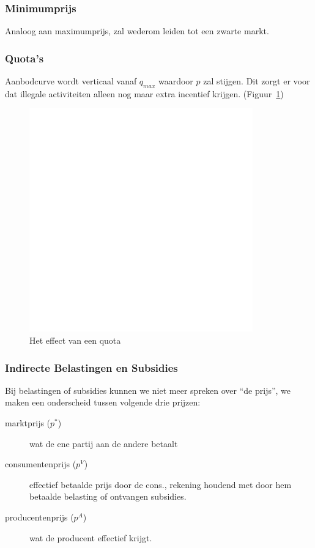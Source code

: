 \subsubsection{Minimumprijs}
Analoog aan maximumprijs, zal wederom leiden tot een zwarte markt.


\subsubsection{Quota's}
Aanbodcurve wordt verticaal vanaf $q_{max}$ waardoor $p$ zal stijgen. Dit zorgt er voor dat illegale activiteiten alleen nog maar extra incentief krijgen. (Figuur~\ref{fig:quota})
\begin{figure}[htbp]
	\centering
	\includegraphics[scale=0.4]{Images/white.png}
	\caption{Het effect van een quota}
	\label{fig:quota}
\end{figure}


\subsubsection{Indirecte Belastingen en Subsidies}
Bij belastingen of subsidies kunnen we niet meer spreken over ``de prijs'', we maken een onderscheid tussen volgende drie prijzen:
\begin{description}
	\item[marktprijs ($p^*$)] wat de ene partij aan de andere betaalt
    \item[consumentenprijs ($p^V$)] effectief betaalde prijs door de cons., rekening houdend met door hem betaalde belasting of ontvangen subsidies.
    \item[producentenprijs ($p^A$)] wat de producent effectief krijgt.
\end{description}

